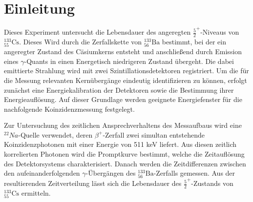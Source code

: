 \chapter{Einleitung}
Dieses Experiment untersucht die Lebensdauer des angeregten $\frac{5}{2}^+$-Niveaus von $^{133}_{55}\mathrm{Cs}$. 
Dieses Wird durch die Zerfallskette von $^{133}_{56}\mathrm{Ba}$ bestimmt, bei der ein angeregter Zustand des Cäsiumkerns entsteht und anschließend durch Emission eines $\gamma$-Quants in einen Energetisch niedrigeren Zustand übergeht.
Die dabei emittierte Strahlung wird mit zwei Szintillationsdetektoren registriert. Um die für die Messung relevanten Kernübergänge eindeutig identifizieren zu können, erfolgt zunächst eine Energiekalibration der Detektoren sowie die Bestimmung ihrer Energieauflösung. 
Auf dieser Grundlage werden geeignete Energiefenster für die nachfolgende Koinzidenzmessung festgelegt.

Zur Untersuchung des zeitlichen Ansprechverhaltens des Messaufbaus wird eine $^{22}Na$-Quelle verwendet, deren $\beta^{+}$-Zerfall zwei simultan entstehende Koinzidenzphotonen mit einer Energie von 511 keV liefert. Aus diesen zeitlich korrelierten Photonen wird die Promptkurve bestimmt, welche die Zeitauflösung des Detektorsystems charakterisiert.
Danach werden die Zeitdifferenzen zwischen den aufeinanderfolgenden $\gamma$-Übergängen des $^{133}_{56}\mathrm{Ba}$-Zerfalls gemessen.
Aus der resultierenden Zeitverteilung lässt sich die Lebensdauer des $\frac{5}{2}^{+}$-Zustands von $^{133}_{55}\mathrm{Cs}$ ermitteln.

 